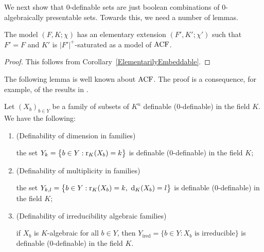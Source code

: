 \noindent
We next show that $0$-definable sets are just boolean combinations of $0$-algebraically presentable sets. Towards this, we need a number of lemmas.

\begin{lem} \label{SaturatedExtension}
The model $(F, K; \chi)$ has an elementary extension $(F', K'; \chi')$ such that $F'= F$ and $K'$ is $|F'|^+$-saturated as a model of $\mathrm{ACF}$.
\end{lem}

\begin{proof}
This follows from Corollary~\ref{ElementarilyEmbeddable}.
\end{proof}

\noindent
The following lemma is well known about $\mathrm{ACF}$. The proof is a consequence, for example, of the results in \cite{LouSmith}. 

\begin{lem}\label{DOE1}
Let $( X_b)_{b\in Y}$ be a family of subsets of $K^n$ definable ($0$-definable) in the field $K$. We have the following:

\begin{enumerate}
\item (Definability of dimension in families)

\noindent
the set $Y_k= \big\{b \in Y : \mathrm{r}_K(X_b) =k\big\}$ is definable ($0$-definable) in the field $K$;
\item (Definability of multiplicity in families)

\noindent
the set $Y_{k, l}= \big\{b \in Y : \mathrm{r}_K(X_b) =k,\  \mathrm{d}_K(X_b) = l \big\}$ is definable ($0$-definable) in the field $K$;
\item (Definability of irreducibility algebraic families)

\noindent
if $X_b$ is $K$-algebraic for all $b \in Y$, then $Y_{\mathrm{ired}}= \{b \in Y : X_b \text{ is irreducible} \}$ is definable ($0$-definable) in the field $K$.
\end{enumerate}
\end{lem}


